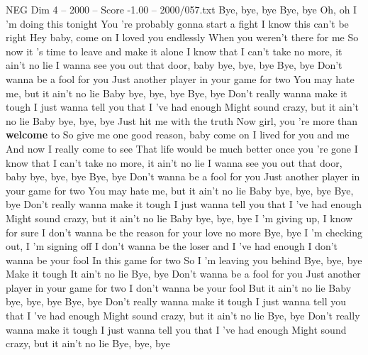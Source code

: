 \begin{textsample}{NEG Dim 4 – 2000 – Score -1.00 – 2000/057.txt}  \label{ex:f4_neg_031}
Bye, bye, bye Bye, bye Oh, oh I 'm doing this tonight You 're probably gonna start a fight I know this can't be right Hey baby, come on I loved you endlessly When you weren't there for me So now it 's time to leave and make it alone I know that I can't take no more, it ain't no lie I wanna see you out that door, baby bye, bye, bye Bye, bye Don't wanna be a fool for you Just another player in your game for two You may hate me, but it ain't no lie Baby bye, bye, bye Bye, bye Don't really wanna make it tough I just wanna tell you that I 've had enough Might sound crazy, but it ain't no lie Baby bye, bye, bye Just hit me with the truth Now girl, you 're more than \textbf{welcome} to So give me one good reason, baby come on I lived for you and me And now I really come to see That life would be much better once you 're gone I know that I can't take no more, it ain't no lie I wanna see you out that door, baby bye, bye, bye Bye, bye Don't wanna be a fool for you Just another player in your game for two You may hate me, but it ain't no lie Baby bye, bye, bye Bye, bye Don't really wanna make it tough I just wanna tell you that I 've had enough Might sound crazy, but it ain't no lie Baby bye, bye, bye I 'm giving up, I know for sure I don't wanna be the reason for your love no more Bye, bye I 'm checking out, I 'm signing off I don't wanna be the loser and I 've had enough I don't wanna be your fool In this game for two So I 'm leaving you behind Bye, bye, bye Make it tough It ain't no lie Bye, bye Don't wanna be a fool for you Just another player in your game for two I don't wanna be your fool But it ain't no lie Baby bye, bye, bye Bye, bye Don't really wanna make it tough I just wanna tell you that I 've had enough Might sound crazy, but it ain't no lie Bye, bye Don't really wanna make it tough I just wanna tell you that I 've had enough Might sound crazy, but it ain't no lie Bye, bye, bye

\end{textsample}
